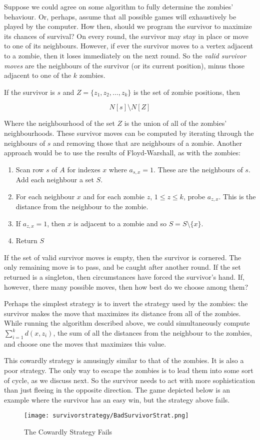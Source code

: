 
Suppose we could agree on some algorithm to fully determine the zombies' behaviour.
Or, perhaps, assume that all possible games will exhaustively be played by the computer.
How then, should we program the survivor to maximize its chances of survival?
On every round, the survivor may stay in place or move to one of its neighbours.
However, if ever the survivor moves to a vertex adjacent to a zombie, then it loses immediately on the next round.
So the \textit{valid survivor moves} are the neighbours of the survivor (or its current position), minus those adjacent to one of the $k$ zombies.

If the survivor is $s$ and $Z = \{z_1, z_2, \dots, z_k\}$ is the set of zombie positions, then

\[N[s]\setminus N[Z]\]

Where the neighbourhood of the set $Z$ is the union of all of the zombies' neighbourhoods.
These survivor moves can be computed by iterating through the neighbours of $s$ and removing those that are neighbours of a zombie.
Another approach would be to use the results of Floyd-Warshall, as with the zombies:

\begin{enumerate}
\item Scan row $s$ of $A$ for indexes $x$ where $a_{s,x} = 1$. These are the neighbours of $s$. Add each neighbour a set $S$.
\item For each neighbour $x$ and for each zombie $z$, $1 \leq z \leq k$, probe $a_{z,x}$. This is the distance from the neighbour to the zombie.
\item If $a_{z,x} = 1$, then $x$ is adjacent to a zombie and so $S = S \setminus \{x\}$.
\item Return $S$
\end{enumerate}

If the set of valid survivor moves is empty, then the survivor is cornered. The only remaining move is to pass, and be caught after another round.
If the set returned is a singleton, then circumstances have forced the survivor's hand.
If, however, there many possible moves, then how best do we choose among them?

Perhaps the simplest strategy is to invert the strategy used by the zombies: the survivor makes the move that maximizes its distance from all of the zombies.
While running the algorithm described above, we could simultaneously compute $\sum_{i=1}^{k} d(x, z_i)$, the sum of all the distances from the neighbour to the
zombies, and choose one the moves that maximizes this value.

This cowardly strategy is amusingly similar to that of the zombies. It is also a poor strategy. The only way to escape the zombies is to lead them into some sort of cycle,
as we discuss next. So the survivor needs to act with more sophistication than just fleeing in the opposite direction. The game depicted below is an example
where the survivor has an easy win, but the strategy above fails.

\begin{figure}
\centering
\texttt{[image: survivorstrategy/BadSurvivorStrat.png]}
\caption{The Cowardly Strategy Fails} \label{fig:BadSurvivorStrat}
\end{figure}
